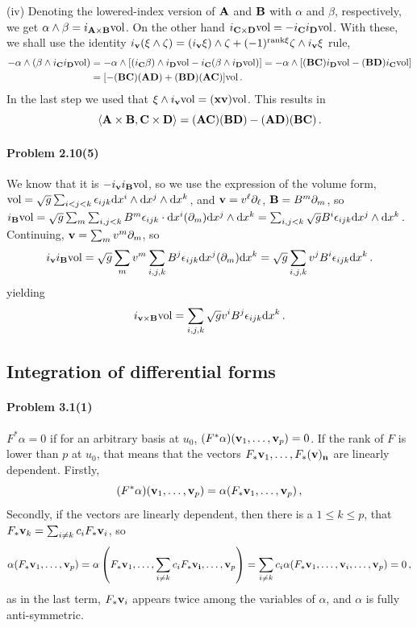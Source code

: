 \documentclass[a4paper,12pt]{article}
\def\d{\mathrm{d}}
\newcommand{\problem}[1]{\paragraph{Problem #1}}
\begin{document}
(iv) Denoting the lowered-index version of ${\bf A}$ and ${\bf B}$ with $\alpha$ and $\beta$, respectively, we get $\alpha \wedge \beta = i_{{\bf A}\times {\bf B}}{\rm vol}$. On the other hand $i_{{\bf C}\times {\bf D}} {\rm vol} = -i_{\bf C}i_{\bf D}{\rm vol}$. With these, we shall use the identity $i_{\bf v}(\xi \wedge \zeta) = (i_{\bf v}\xi) \wedge \zeta + (-1)^{{\rm rank} \xi}\zeta \wedge i_{\bf v}\xi$ rule,
\[\begin{aligned}
 -\alpha \wedge (\beta \wedge i_{\bf C}i_{\bf D}{\rm vol}) &= -\alpha \wedge [(i_{\bf C}\beta) \wedge i_{\bf D}{\rm vol} - i_{\bf C}(\beta \wedge i_{\bf D}{\rm vol})] = -\alpha \wedge [ ({\bf B} {\bf C}) i_{\bf D}{\rm vol} - ({\bf B}{\bf D})i_{\bf C}{\rm vol}]\\
 &= [-({\bf BC})({\bf AD}) + ({\bf BD})({\bf AC})]{\rm vol} \,.
\end{aligned}\]
In the last step we used that $\xi \wedge i_{\bf v}{\rm vol} = ({\bf x}{\bf v}){\rm vol}$. This results in
\[
 \langle {\bf A}\times {\bf B}, {\bf C}\times {\bf D}\rangle = ({\bf A C})({\bf BD}) - ({\bf AD})({\bf BC})\,.
\]


\problem{2.10(5)} We know that it is $-i_{\bf v}i_{\bf B}{\rm vol}$, so we use the expression of the volume form, ${\rm vol} = \sqrt{g}\sum_{i<j<k}\epsilon_{ijk}\d x^i \wedge \d x^j \wedge \d x^k$, and ${\bf v}=v^\ell \partial_\ell$, ${\bf B} =B^m \partial_m$, so $i_{\bf B}{\rm vol} = \sqrt{g}\sum_m \sum_{i,j<k} B^m\epsilon_{ijk}\cdot\d x^i(\partial_m)\d x^j \wedge \d x^k = \sum_{i,j<k}\sqrt{g}B^i\epsilon_{ijk}\d x^j \wedge \d x^k$. Continuing, ${\bf v} = \sum_m v^m \partial_m$, so
\[
i_{\bf v}i_{\bf B} {\rm vol} = \sqrt{g}\sum_m v^m \sum_{i,j,k} B^j \epsilon_{ijk} \d x^j(\partial_m) \d x^k = \sqrt{g}\sum_{i,j,k} v^j B^i \epsilon_{ijk}\d x^k\,.
\]
yielding
\[
 i_{{\bf v}\times {\bf B}}{\rm vol} = \sum_{i,j,k} \sqrt
{g} v^i B^j \epsilon_{ijk}\d x^k\,.\]


\subsection{Integration of differential forms}

\problem{3.1(1)} $F^*\alpha =0$ if for an arbitrary basis at $u_0$, $(F^*\alpha)({\bf v}_1, \dots, {\bf v}_p) = 0$. If the rank of $F$ is lower than $p$ at $u_0$, that means that the vectors $F_* {\bf v}_1, \dots, F_*(\bf v)_n$ are linearly dependent. Firstly,
\[
 (F^*\alpha)({\bf v}_1, \dots, {\bf v}_p) = \alpha(F_*{\bf v}_1, \dots, {\bf v}_p)\,,
\]
Secondly, if the vectors are linearly dependent, then there is a $1 \le k \le p$, that $F_* {\bf v}_k = \sum_{i\ne k} c_i F_*{\bf v}_i$, so
\[
 \alpha(F_*{\bf v}_1, \dots, {\bf v}_p) = \alpha\left(F_* {\bf v}_1, \dots, \sum_{i\ne k} c_i F_* {\bf v_i}, \dots, {\bf v}_p\right) = \sum_{i\ne k} c_i \alpha(F_*{\bf v}_1, \dots, {\bf v}_i, \dots, {\bf v}_p)=0\,,
\]
as in the last term, $F_*{\bf v}_i$ appears twice among the variables of $\alpha$, and $\alpha$ is fully anti-symmetric.
\end{document}
